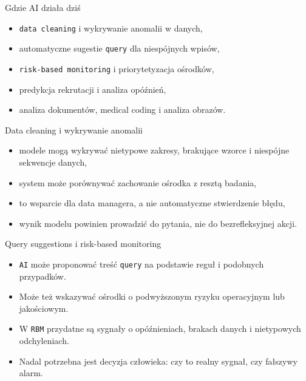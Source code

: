 \begin{frame}{Gdzie AI działa dziś}
  \begin{itemize}
    \item \texttt{data cleaning} i wykrywanie anomalii w danych,
    \item automatyczne sugestie \texttt{query} dla niespójnych wpisów,
    \item \texttt{risk-based monitoring} i priorytetyzacja ośrodków,
    \item predykcja rekrutacji i analiza opóźnień,
    \item analiza dokumentów, medical coding i analiza obrazów.
  \end{itemize}
\end{frame}

\begin{frame}{Data cleaning i wykrywanie anomalii}
  \begin{itemize}
    \item modele mogą wykrywać nietypowe zakresy, brakujące wzorce i niespójne sekwencje danych,
    \item system może porównywać zachowanie ośrodka z resztą badania,
    \item to wsparcie dla data managera, a nie automatyczne stwierdzenie błędu,
    \item wynik modelu powinien prowadzić do pytania, nie do bezrefleksyjnej akcji.
  \end{itemize}
\end{frame}

\begin{frame}{Query suggestions i risk-based monitoring}
  \begin{itemize}
    \item \texttt{AI} może proponować treść \texttt{query} na podstawie reguł i podobnych przypadków.
    \item Może też wskazywać ośrodki o podwyższonym ryzyku operacyjnym lub jakościowym.
    \item W \texttt{RBM} przydatne są sygnały o opóźnieniach, brakach danych i nietypowych odchyleniach.
    \item Nadal potrzebna jest decyzja człowieka: czy to realny sygnał, czy fałszywy alarm.
  \end{itemize}
\end{frame}

